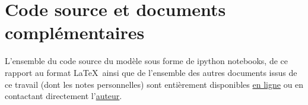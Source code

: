 
\chapter{Code source et documents complémentaires} %

\label{Code} %

L'ensemble du code source du modèle sous forme de ipython notebooks, de ce rapport au format \LaTeX~ainsi que de l'ensemble des autres documents issus de ce travail (dont les notes personnelles) sont entièrement disponibles \href{https://github.com/pierrealbiges/ActiveVision}{en ligne} ou en contactant directement l'\href{pierre.albiges@etu.univ-amu.fr}{auteur}.